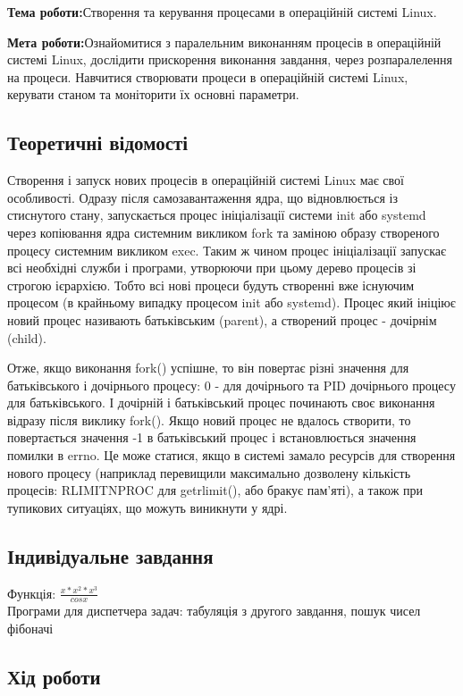 \documentclass[12pt]{extarticle}
\begin{document}
\textbf{Тема роботи:}Створення та керування процесами в операційній системі Linux.
\vspace{12pt}

\textbf{Мета роботи:}Ознайомитися з паралельним виконанням процесів в операційній
системі Linux, дослідити прискорення виконання завдання, через
розпаралелення на процеси. Навчитися створювати процеси в операційній
системі Linux, керувати станом та моніторити їх основні параметри.

\subsection*{Теоретичні відомості}
Створення і запуск нових процесів в операційній системі Linux має
свої особливості. Одразу після самозавантаження ядра, що відновлюється
із стиснутого стану, запускається процес ініціалізації системи init або
systemd через копіювання ядра системним викликом fork та заміною
образу створеного процесу системним викликом exec. Таким ж чином
процес ініціалізації запускає всі необхідні служби і програми, утворюючи
при цьому дерево процесів зі строгою ієрархією. Тобто всі нові процеси
будуть створенні вже існуючим процесом (в крайньому випадку процесом
init або systemd). Процес який ініціює новий процес називають
батьківським (parent), а створений процес - дочірнім (child).

Отже, якщо виконання fork() успішне, то він повертає різні значення
для батьківського і дочірнього процесу: 0 - для дочірнього та PID
дочірнього процесу для батьківського. І дочірній і батьківський процес
починають своє виконання відразу після виклику fork().
Якщо новий процес не вдалось створити, то повертається значення
-1 в батьківський процес і встановлюється значення помилки в errno. Це
може статися, якщо в системі замало ресурсів для створення нового
процесу (наприклад перевищили максимально дозволену кількість
процесів: RLIMITNPROC для getrlimit(), або бракує пам’яті), а також при
тупикових ситуаціях, що можуть виникнути у ядрі.

\subsection*{Індивідуальне завдання}

Функція: $\frac{x * x^2 * x^3}{cos x}$\\

Програми для диспетчера задач: табуляція з другого завдання, пошук чисел фібоначі

\subsection*{Хід роботи}
\end{document}
